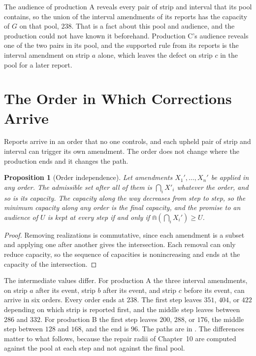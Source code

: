 \documentclass[11pt,twoside,openright]{book}
\theoremstyle{plain}
\newtheorem{proposition}[theorem]{Proposition}
\theoremstyle{definition}
\theoremstyle{remark}
\begin{document}
The audience of production A reveals every pair of strip and interval that its pool contains, so the union of the interval amendments of its reports has the capacity of $G$ on that pool, $238$. That is a fact about this pool and audience, and the production could not have known it beforehand. Production C's audience reveals one of the two pairs in its pool, and the supported rule from its reports is the interval amendment on strip $a$ alone, which leaves the defect on strip $c$ in the pool for a later report.

\section{The Order in Which Corrections Arrive}\label{sec:order}

Reports arrive in an order that no one controls, and each upheld pair of strip and interval can trigger its own amendment. The order does not change where the production ends and it changes the path.

\begin{proposition}[Order independence]\label{prop:order}
Let amendments $X_1',\dots,X_n'$ be applied in any order. The admissible set after all of them is $\bigcap_iX'_i$ whatever the order, and so is its capacity. The capacity along the way decreases from step to step, so the minimum capacity along any order is the final capacity, and the promise to an audience of $U$ is kept at every step if and only if $\Cap(\bigcap_iX_i')\ge U$.
\end{proposition}

\begin{proof}
Removing realizations is commutative, since each amendment is a subset and applying one after another gives the intersection. Each removal can only reduce capacity, so the sequence of capacities is nonincreasing and ends at the capacity of the intersection.
\end{proof}

The intermediate values differ. For production A the three interval amendments, on strip $a$ after its event, strip $b$ after its event, and strip $c$ before its event, can arrive in six orders. Every order ends at $238$. The first step leaves $351$, $404$, or $422$ depending on which strip is reported first, and the middle step leaves between $286$ and $332$. For production B the first step leaves $200$, $288$, or $176$, the middle step between $128$ and $168$, and the end is $96$. The paths are in . The differences matter to what follows, because the repair radii of Chapter~10 are computed against the pool at each step and not against the final pool.
\end{document}
